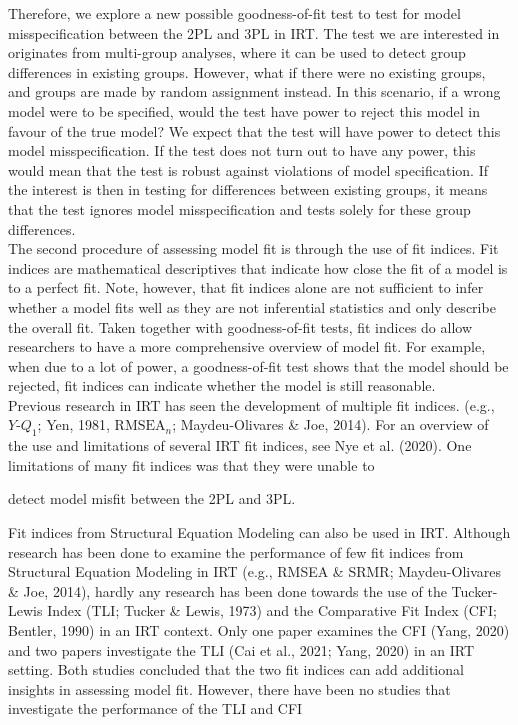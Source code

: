 \documentclass[Royal,sageapa,times,doublespace]{sagej}
\begin{document}
\indent Therefore, we explore a new possible goodness-of-fit test to test for model misspecification between the 2PL and 3PL in IRT. The test we are interested in originates from multi-group analyses, where it can be used to detect group differences in existing groups. However, what if there were no existing groups, and groups are made by random assignment instead. In this scenario, if a wrong model were to be specified, would the test have power to reject this model in favour of the true model? We expect that the test will have power to detect this model misspecification. If the test does not turn out to have any power, this would mean that the test is robust against violations of model specification. If the interest is then in testing for differences between existing groups, it means that the test ignores model misspecification and tests solely for these group differences. \\
\indent The second procedure of assessing model fit is through the use of fit indices. Fit indices are mathematical descriptives that indicate how close the fit of a model is to a perfect fit. Note, however, that fit indices alone are not sufficient to infer whether a model fits well as they are not inferential statistics and only describe the overall fit. Taken together with goodness-of-fit tests, fit indices do allow researchers to have a more comprehensive overview of model fit. For example, when due to a lot of power, a goodness-of-fit test shows that the model should be rejected, fit indices can indicate whether the model is still reasonable. \\ 
\indent Previous research in IRT has seen the development of multiple fit indices. (e.g., $Y\text{-}Q_1$; Yen, 1981, $\text{RMSEA}_n$; Maydeu-Olivares \& Joe, 2014). For an overview of the use and limitations of several IRT fit indices, see Nye et al. (2020). One limitations of many fit indices was that they were unable to 

detect model misfit between the 2PL and 3PL. %

Fit indices from Structural Equation Modeling can also be used in IRT. Although research has been done to examine the performance of few fit indices from Structural Equation Modeling in IRT (e.g., RMSEA \& SRMR; Maydeu-Olivares \& Joe, 2014), hardly any research has been done towards the use of the Tucker-Lewis Index (TLI; Tucker \& Lewis, 1973) and the Comparative Fit Index (CFI; Bentler, 1990) in an IRT context. Only one paper examines the CFI (Yang, 2020) and two papers investigate the TLI (Cai et al., 2021; Yang, 2020) in an IRT setting. Both studies concluded that the two fit indices can add additional insights in assessing model fit. However, there have been no studies that investigate the performance of the TLI and CFI 
\end{document}
